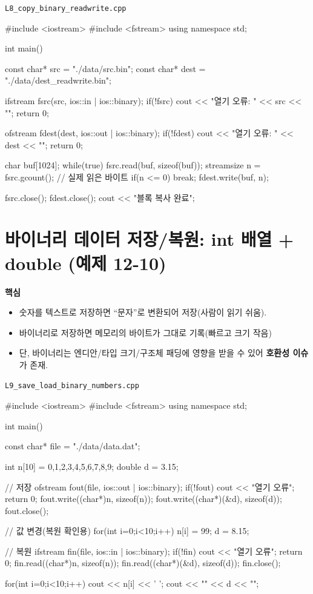\documentclass[11pt,a4paper]{article}
\newcommand{\filetag}[1]{\texttt{\color{Accent}#1}}
\begin{document}
\noindent\filetag{L8\_copy\_binary\_readwrite.cpp}
\begin{cppcode}
#include <iostream>
#include <fstream>
using namespace std;

int main() {
    const char* src  = "./data/src.bin";
    const char* dest = "./data/dest_readwrite.bin";

    ifstream fsrc(src, ios::in | ios::binary);
    if(!fsrc) { cout << "열기 오류: " << src << "\n"; return 0; }

    ofstream fdest(dest, ios::out | ios::binary);
    if(!fdest) { cout << "열기 오류: " << dest << "\n"; return 0; }

    char buf[1024];
    while(true) {
        fsrc.read(buf, sizeof(buf));
        streamsize n = fsrc.gcount(); // 실제 읽은 바이트
        if(n <= 0) break;
        fdest.write(buf, n);
    }

    fsrc.close();
    fdest.close();
    cout << "블록 복사 완료\n";
}
\end{cppcode}

\section{바이너리 데이터 저장/복원: int 배열 + double (예제 12-10)}
\begin{GoalBox}
\textbf{핵심}
\begin{itemize}[leftmargin=18pt]
  \item 숫자를 텍스트로 저장하면 ``문자''로 변환되어 저장(사람이 읽기 쉬움).
  \item 바이너리로 저장하면 메모리의 바이트가 그대로 기록(빠르고 크기 작음) %
  \item 단, 바이너리는 엔디안/타입 크기/구조체 패딩에 영향을 받을 수 있어 \textbf{호환성 이슈}가 존재.
\end{itemize}
\end{GoalBox}

\noindent\filetag{L9\_save\_load\_binary\_numbers.cpp}
\begin{cppcode}
#include <iostream>
#include <fstream>
using namespace std;

int main() {
    const char* file = "./data/data.dat";

    int n[10] = {0,1,2,3,4,5,6,7,8,9};
    double d = 3.15;

    // 저장
    ofstream fout(file, ios::out | ios::binary);
    if(!fout) { cout << "열기 오류\n"; return 0; }
    fout.write((char*)n, sizeof(n));
    fout.write((char*)(&d), sizeof(d));
    fout.close();

    // 값 변경(복원 확인용)
    for(int i=0;i<10;i++) n[i] = 99;
    d = 8.15;

    // 복원
    ifstream fin(file, ios::in | ios::binary);
    if(!fin) { cout << "열기 오류\n"; return 0; }
    fin.read((char*)n, sizeof(n));
    fin.read((char*)(&d), sizeof(d));
    fin.close();

    for(int i=0;i<10;i++) cout << n[i] << ' ';
    cout << "\n" << d << "\n";
}
\end{cppcode}
\end{document}
